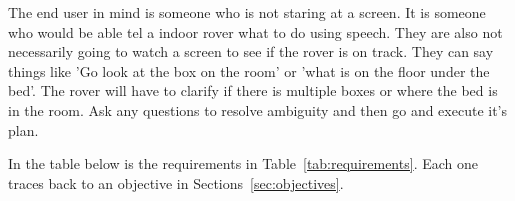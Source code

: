 

\label{chap:design}

\label{sec:requirements}
The end user in mind is someone who is not staring at a screen. It is someone who would be able
tel a indoor rover what to do using speech. They are also not necessarily going to watch a screen 
to see if the rover is on track. They can say things like 'Go look at the box on the room' or 
'what is on the floor under the bed'. The rover will have to clarify if there is multiple boxes
or where the bed is in the room. Ask any questions to resolve ambiguity and then go and execute it's 
plan.

In the table below is the requirements in Table~\ref{tab:requirements}. Each one traces back to an objective in
Sections~\ref{sec:objectives}.

